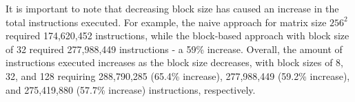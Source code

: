 \noindent It is important to note that decreasing block size has caused an increase in the total instructions executed. For example, the naive approach for matrix size \( 256^2 \) required
174,620,452 instructions, while the block-based approach with block size of 32 required 277,988,449 instructions - a 59\% increase. Overall, the amount of instructions executed
increases as the block size decreases, with block sizes of 8, 32, and 128 requiring 288,790,285 (65.4\% increase), 277,988,449 (59.2\% increase), and 275,419,880 (57.7\% increase)
instructions, respectively.


